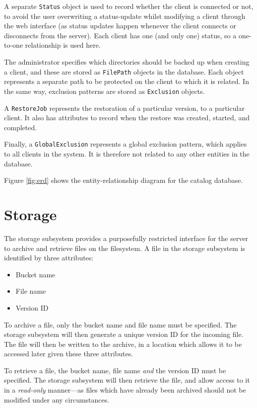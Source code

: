 A separate \verb!Status! object is used to record whether the client is
connected or not, to avoid the user overwriting a status-update whilst
modifying a client through the web interface (as status updates happen whenever
the client connects or disconnects from the server). Each client has one (and
only one) status, so a one-to-one relationship is used here.

The administrator specifies which directories should be backed up when creating
a client, and these are stored as \verb!FilePath! objects in the database. Each
object represents a separate path to be protected on the client to which it is
related. In the same way, exclusion patterns are stored as \verb!Exclusion!
objects.

A \verb!RestoreJob! represents the restoration of a particular version, to
a particular client. It also has attributes to record when the restore was
created, started, and completed.

Finally, a \verb!GlobalExclusion! represents a global exclusion pattern, which
applies to all clients in the system. It is therefore not related to any other
entities in the database.

Figure \ref{fig:erd} shows the entity-relationship diagram for the catalog
database.

\section{Storage}

The storage subsystem provides a purposefully restricted interface for the
server to archive and retrieve files on the filesystem. A file in the storage
subsystem is identified by three attributes:

\begin{itemize}
    \item Bucket name
    \item File name
    \item Version ID
\end{itemize}

To archive a file, only the bucket name and file name must be specified. The
storage subsystem will then generate a unique version ID for the incoming file.
The file will then be written to the archive, in a location which allows it to
be accessed later given these three attributes.

To retrieve a file, the bucket name, file name \emph{and} the version ID must
be specified. The storage subsystem will then retrieve the file, and allow
access to it in a \emph{read-only} manner---as files which have already been
archived should not be modified under any circumstances.

